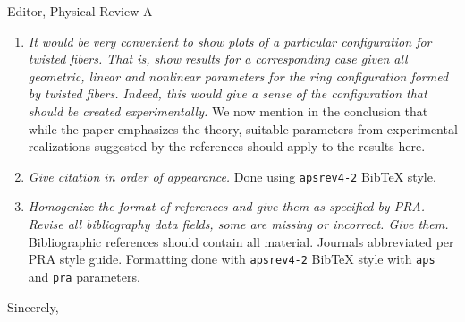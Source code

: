 \documentclass[11pt]{letter}
\begin{document}
\begin{letter}{Editor, Physical Review A}
\begin{enumerate}
\item \emph{It would be very convenient to show plots of a particular configuration for twisted fibers. That is, show results for a corresponding case given all geometric, linear and nonlinear parameters for the ring configuration formed by twisted fibers. Indeed, this would give a sense of the configuration that should be created experimentally.} We now mention in the conclusion that while the paper emphasizes the theory, suitable parameters from experimental realizations suggested by the references should apply to the results here.

\item \emph{Give citation in order of appearance.} Done using \texttt{apsrev4-2} BibTeX style.

\item \emph{Homogenize the format of references and give them as specified by PRA. Revise all bibliography data fields, some are missing or incorrect. Give them.} Bibliographic references should contain all material. Journals abbreviated per PRA style guide. Formatting done with \texttt{apsrev4-2} BibTeX style with \texttt{aps} and \texttt{pra} parameters.

\end{enumerate}

\closing{Sincerely,}

\end{letter}
\end{document}
